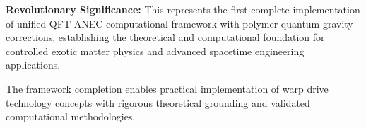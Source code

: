 \documentclass[11pt]{article}
\begin{document}
\textbf{Revolutionary Significance:} This represents the first complete implementation of unified QFT-ANEC computational framework with polymer quantum gravity corrections, establishing the theoretical and computational foundation for controlled exotic matter physics and advanced spacetime engineering applications.

The framework completion enables practical implementation of warp drive technology concepts with rigorous theoretical grounding and validated computational methodologies.
\end{document}

